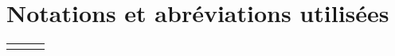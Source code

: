 \documentclass[10pt,letterpaper]{article}
\begin{document}
\TitlePAGE %
\hypertarget{ToC}{\tableofcontents}
\newpage

\setcounter{page}{1}
\section*{Notations et abréviations utilisées}
\begin{tabular}{clc}
 \hline \\
\end{tabular}
\newpage
\end{document}
